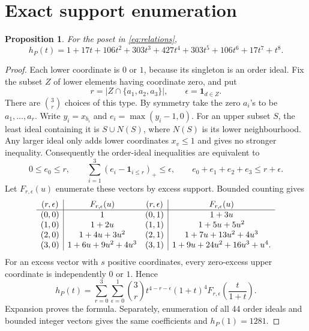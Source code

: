 \documentclass[11pt]{amsart}
\newtheorem{proposition}[theorem]{Proposition}\theoremstyle{definition}
\begin{document}
\section{Exact support enumeration}
\begin{proposition}\label{prop:h}
For the poset in \eqref{eq:relations},
\[
h_P(t)=1+17t+106t^2+303t^3+427t^4+303t^5+106t^6+17t^7+t^8.
\]
\end{proposition}
\begin{proof}
Each lower coordinate is $0$ or $1$, because its singleton is an order ideal.
Fix the subset $Z$ of lower elements having coordinate zero, and put
\[r=|Z\cap\{a_1,a_2,a_3\}|,\qquad
\epsilon=\boldsymbol1_{d\in Z}.\]
There are $\binom3r$ choices of this type. By symmetry take the zero $a_i$'s
to be $a_1,\ldots,a_r$. Write $y_i=x_{b_i}$ and
$e_i=\max(y_i-1,0)$. For an upper subset $S$, the least ideal containing it is
$S\cup N(S)$, where $N(S)$ is its lower neighbourhood. Any larger ideal only
adds lower coordinates $x_v\le1$ and gives no stronger inequality.
Consequently the order-ideal inequalities are equivalent to
\[
0\le e_0\le r,\qquad
\sum_{i=1}^3(e_i-\boldsymbol1_{i\le r})_+\le\epsilon,\qquad
e_0+e_1+e_2+e_3\le r+\epsilon.
\]
Let $F_{r,\epsilon}(u)$ enumerate these vectors by excess support. Bounded
counting gives
\[
\begin{array}{c|c@{\quad}c|c}
(r,\epsilon)&F_{r,\epsilon}(u)&(r,\epsilon)&F_{r,\epsilon}(u)\\ \hline
(0,0)&1 &(0,1)&1+3u\\
(1,0)&1+2u &(1,1)&1+5u+5u^2\\
(2,0)&1+4u+3u^2 &(2,1)&1+7u+13u^2+4u^3\\
(3,0)&1+6u+9u^2+4u^3 &(3,1)&1+9u+24u^2+16u^3+u^4.
\end{array}
\]
For an excess vector with $s$ positive coordinates, every zero-excess upper
coordinate is independently $0$ or $1$. Hence
\[
h_P(t)=\sum_{r=0}^3\sum_{\epsilon=0}^1\binom3r
t^{4-r-\epsilon}(1+t)^4F_{r,\epsilon}\!\left(\frac{t}{1+t}\right).
\]
Expansion proves the formula. Separately, enumeration of all 44 order ideals
and bounded integer vectors gives the same coefficients and $h_P(1)=1281$.
\end{proof}
\end{document}
